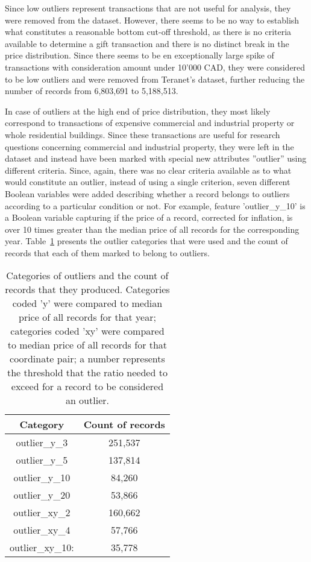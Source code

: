 Since low outliers represent transactions that are not useful for analysis, they were removed from the dataset.
However, there seems to be no way to establish what constitutes a reasonable bottom cut-off threshold, as there is no criteria available to determine a gift transaction and there is no distinct break in the price distribution.
Since there seems to be en exceptionally large spike of transactions with consideration amount under 10'000 CAD, they were considered to be low outliers and were removed from Teranet's dataset, further reducing the number of records from 6,803,691 to 5,188,513.

In case of outliers at the high end of price distribution, they most likely correspond to transactions of expensive commercial and industrial property or whole residential buildings.
Since these transactions are useful for research questions concerning commercial and industrial property, they were left in the dataset and instead have been marked with special new attributes ''outlier'' using different criteria.
Since, again, there was no clear criteria available as to what would constitute an outlier, instead of using a single criterion, seven different Boolean variables were added describing whether a record belongs to outliers according to a particular condition or not.
For example, feature 'outlier\_y\_10' is a Boolean variable capturing if the price of a record, corrected for inflation, is over 10 times greater than the median price of all records for the corresponding year.
Table~\ref{tab:outliers} presents the outlier categories that were used and the count of records that each of them marked to belong to outliers.

\begin{table}[h!]
    \centering
    \begin{tabular}{|| c | c ||}
        \hline
        Category & Count of records \\
        \hline
        \hline
        outlier\_y\_3 & 251,537 \\
        \hline
        outlier\_y\_5 & 137,814 \\
        \hline
        outlier\_y\_10 & 84,260 \\
        \hline
        outlier\_y\_20 & 53,866 \\
        \hline
        outlier\_xy\_2 & 160,662 \\
        \hline
        outlier\_xy\_4 & 57,766 \\
        \hline
        outlier\_xy\_10: & 35,778 \\
        \hline
    \end{tabular}
    \caption{Categories of outliers and the count of records that they produced.
    Categories coded 'y' were compared to median price of all records for that year;
    categories coded 'xy' were compared to median price of all records for that coordinate pair;
    a number represents the threshold that the ratio needed to exceed for a record to be considered an outlier.}
    \label{tab:outliers}

\end{table}

